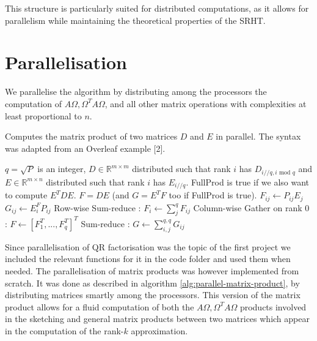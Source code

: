 \documentclass[a4paper, 12pt,oneside]{article}
\begin{document}
	This structure is particularly suited for distributed computations, as it allows for parallelism while maintaining the theoretical properties of the SRHT.
	\section{Parallelisation}
	We parallelise the algorithm by distributing among the processors the computation of $A \Omega,\Omega^T A \Omega$, and all other matrix operations with complexities at least proportional to $n$. 
	\begin{algorithm}[H]
		\caption{Computes the matrix product of two matrices $D$ and $E$ in parallel. The syntax was adapted from an Overleaf example [2].}\label{alg:parallel-matrix-product}
		\begin{algorithmic}
		\Require $q=\sqrt{P}$ is an integer, $D\in\mathbb R^{m\times m}$  distributed such that rank $i$ has $D_{i//q,i\text{ mod }q}$ and $E\in\mathbb R^{m\times n}$ distributed such that rank $i$ has $E_{i//q}$. FullProd is true if we also want to compute $E^TDE$.
		\Ensure $F=DE$ (and $G=E^TF$ too if FullProd is true). 
		\State $F_{ij} \gets P_{ij}E_j$
			\State $G_{ij} \gets E_i^FP_{ij}$
		\EndIf		
		\State Row-wise Sum-reduce : $F_i\gets \sum_j^q F_{ij}$
		\State Column-wise Gather on rank 0 : $F\gets [F_1^T,...,F_q^T]^T$
			\State Sum-reduce : $G\gets \sum_{i,j}^{q,q} G_{ij}$
		\EndIf
		\end{algorithmic}
	\end{algorithm}
	Since parallelisation of QR factorisation was the topic of the first project we included the relevant functions for it in the code folder and used them when needed. The parallelisation of matrix products was however implemented from scratch. It was done as described in algorithm \ref{alg:parallel-matrix-product}, by distributing matrices smartly among the processors. This version of the matrix product allows for a fluid computation of both the $A \Omega,\Omega^T A \Omega$ products involved in the sketching and general matrix products between two matrices which appear in the computation of the rank-$k$ approximation. 
	
\end{document}
